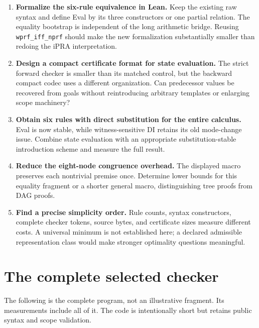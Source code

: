 \documentclass[11pt]{article}
\theoremstyle{definition}
\begin{document}
\begin{enumerate}
\item \textbf{Formalize the six-rule equivalence in Lean.} Keep the
existing raw syntax and define Eval by its three constructors or one
partial relation. The equality bootstrap is independent of the long
arithmetic bridge. Reusing \texttt{wprf\_iff\_nprf} should make the
new formalization substantially smaller than redoing the iPRA interpretation.
\item \textbf{Design a compact certificate format for state evaluation.}
The strict forward checker is smaller than its matched control, but the
backward compact codec uses a different organization. Can predecessor
values be recovered from goals without reintroducing arbitrary templates
or enlarging scope machinery?
\item \textbf{Obtain six rules with direct substitution for the entire
calculus.} Eval is now stable, while witness-sensitive DI retains its
old mode-change issue. Combine state evaluation with an appropriate
substitution-stable introduction scheme and measure the full result.
\item \textbf{Reduce the eight-node congruence overhead.} The displayed
macro preserves each nontrivial premise once. Determine lower bounds
for this equality fragment or a shorter general macro, distinguishing
tree proofs from DAG proofs.
\item \textbf{Find a precise simplicity order.} Rule counts, syntax
constructors, complete checker tokens, source bytes, and certificate sizes
measure different costs. A universal minimum is not established here;
a declared admissible representation class would make stronger optimality
questions meaningful.
\end{enumerate}

\appendix
\section{The complete selected checker}
The following is the complete program, not an illustrative fragment.
Its measurements include all of it. The code is intentionally short but
retains public syntax and scope validation.

\end{document}
